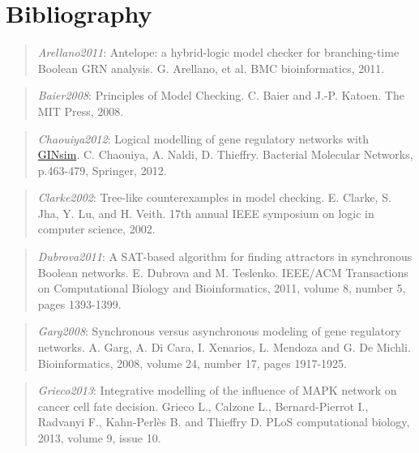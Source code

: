 \documentclass[letterpaper,10pt,english]{sphinxmanual}
\begin{document}
\chapter{Bibliography}
\label{Bibliography:bibliography}\label{Bibliography::doc}\label{Bibliography:arellano2011}\begin{quote}

\emph{Arellano2011}:
Antelope: a hybrid-logic model checker for branching-time Boolean GRN analysis.
G. Arellano, et al.
BMC bioinformatics, 2011.
\end{quote}
\label{Bibliography:baier2008}\begin{quote}

\emph{Baier2008}:
Principles of Model Checking.
C. Baier and J.-P. Katoen.
The MIT Press, 2008.
\end{quote}
\label{Bibliography:chaouiya2012}\begin{quote}

\emph{Chaouiya2012}:
Logical modelling of gene regulatory networks with \href{http://ginsim.org/home}{GINsim}.
C. Chaouiya, A. Naldi, D. Thieffry.
Bacterial Molecular Networks, p.463-479, Springer, 2012.
\end{quote}
\label{Bibliography:clarke2002}\begin{quote}

\emph{Clarke2002}:
Tree-like counterexamples in model checking.
E. Clarke, S. Jha, Y. Lu, and H. Veith.
17th annual IEEE symposium on logic in computer science, 2002.
\end{quote}
\label{Bibliography:dubrova2011}\begin{quote}

\emph{Dubrova2011}:
A SAT-based algorithm for finding attractors in synchronous Boolean networks.
E. Dubrova and M. Teslenko.
IEEE/ACM Transactions on Computational Biology and Bioinformatics, 2011, volume 8, number 5, pages 1393-1399.
\end{quote}
\label{Bibliography:garg2008}\begin{quote}

\emph{Garg2008}:
Synchronous versus asynchronous modeling of gene regulatory networks.
A. Garg, A. Di Cara, I. Xenarios, L. Mendoza and G. De Michli.
Bioinformatics, 2008, volume 24, number 17, pages 1917-1925.
\end{quote}
\label{Bibliography:grieco2013}\begin{quote}

\emph{Grieco2013}:
Integrative modelling of the influence of MAPK network on cancer cell fate decision.
Grieco L., Calzone L., Bernard-Pierrot I., Radvanyi F., Kahn-Perlès B. and Thieffry D.
PLoS computational biology, 2013, volume 9, issue 10.
\end{quote}
\end{document}
